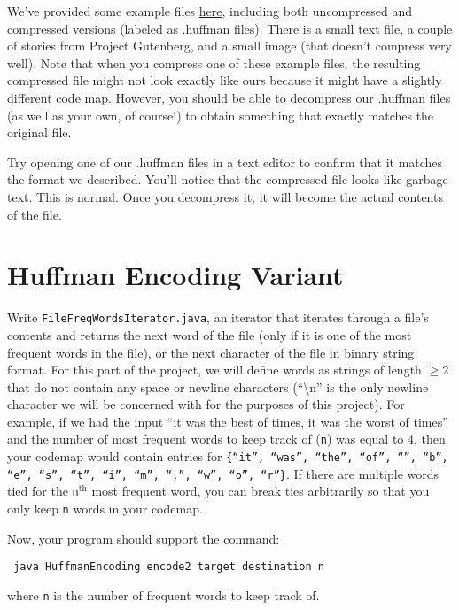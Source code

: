 \documentclass[11pt]{article}
\begin{document}
We've provided some example files \href{http://inst.eecs.berkeley.edu/~cs61bl/code/proj2/sample_files/}{\color{blue} here}, including both uncompressed and compressed versions (labeled as .huffman files). There is a small text file, a couple of stories from Project Gutenberg, and a small image (that doesn't compress very well). Note that when you compress one of these example files, the resulting compressed file might not look exactly like ours because it might have a slightly different code map. However, you should be able to decompress our .huffman files (as well as your own, of course!) to obtain something that exactly matches the original file.

Try opening one of our .huffman files in a text editor to confirm that it matches the format we described. You'll notice that the compressed file looks like garbage text. This is normal. Once you decompress it, it will become the actual contents of the file. 

\section{Huffman Encoding Variant}
Write \texttt{FileFreqWordsIterator.java}, an iterator that iterates through a file's contents and returns the next word of the file (only if it is one of the most frequent words in the file), or the next character of the file in binary string format. For this part of the project, we will define words as strings of length $\ge 2$ that do not contain any space or newline characters (``\textbackslash n'' is the only newline character we will be concerned with for the purposes of this project). For example, if we had the input ``it was the best of times, it was the worst of times'' and the number of most frequent words to keep track of (\texttt{n}) was equal to 4, then your codemap would contain entries for \texttt{\{``it'', ``was'', ``the'', ``of'', ``\textvisiblespace'', ``b'', ``e'', ``s'', ``t'', ``i'', ``m'', ``,'', ``w'', ``o'', ``r''\}}. If there are multiple words tied for the \texttt{n}$^{\text{th}}$ most frequent word, you can break ties arbitrarily so that you only keep \texttt{n} words in your codemap.

\newpage

Now, your program should support the command:
\begin{center}
\texttt{
java HuffmanEncoding encode2 target destination n
}
\end{center}
where \texttt{n} is the number of frequent words to keep track of.
\end{document}
